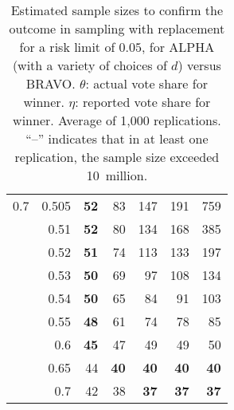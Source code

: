 \documentclass[12pt,runningheads]{llncs}
\begin{document}
{\begin{table}
\begin{tabular}{lr|rrrr|r}
\hline
0.7 & 0.505 & \bf{52} & 83 & 147 & 191  & 759 \\
     & 0.51 & \bf{52} & 80 & 134 & 168  & 385 \\
     & 0.52 & \bf{51} & 74 & 113 & 133  & 197 \\
     & 0.53 & \bf{50} & 69 & 97 & 108  & 134 \\
     & 0.54 & \bf{50} & 65 & 84 & 91  & 103 \\
     & 0.55 & \bf{48} & 61 & 74 & 78  & 85 \\
     & 0.6 & \bf{45} & 47 & 49 & 49  & 50 \\
     & 0.65 & 44 & \bf{40} & \bf{40} & \bf{40}  & \bf{40} \\
     & 0.7 & 42 & 38 & \bf{37} & \bf{37}  & \bf{37}
\end{tabular}
\caption{\protect \label{tab:results} Estimated sample sizes to confirm the outcome in sampling
with replacement for a risk limit of $0.05$, for ALPHA (with a variety of choices of
$d$) versus BRAVO.
$\theta$: actual vote share for winner.
$\eta$: reported vote share for winner.
Average of 1,000 replications.
``--'' indicates that in at least one replication, the sample size exceeded 10~million.
}
\end{table}

}
\end{document}
